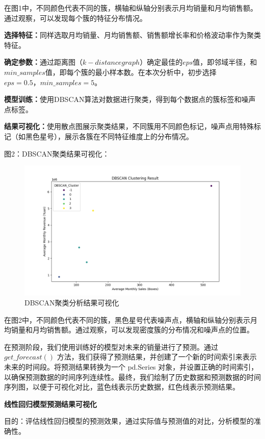 \documentclass[a4paper]{article}
\begin{document}
在图1中，不同颜色代表不同的簇，横轴和纵轴分别表示月均销量和月均销售额。通过观察，可以发现每个簇的特征分布情况。

\textbf{选择特征：}同样选取月均销量、月均销售额、销售额增长率和价格波动率作为聚类特征。

\textbf{确定参数：}通过距离图$（k-distance graph）$确定最佳的$eps$值，即邻域半径，和$min\_samples$值，即每个簇的最小样本数。在本次分析中，初步选择$eps=0.5，min\_samples=5$。

\textbf{模型训练：}使用DBSCAN算法对数据进行聚类，得到每个数据点的簇标签和噪声点标签。

\textbf{结果可视化：}使用散点图展示聚类结果，不同簇用不同颜色标记，噪声点用特殊标记（如黑色星号），展示各簇在不同特征维度上的分布情况。

图2：DBSCAN聚类结果可视化：

\begin{figure}[H]
	\centering
	\includegraphics[width=1.0\textwidth]{img/Figure_2.png}
	\caption{DBSCAN聚类分析结果可视化}
\end{figure}

在图2中，不同颜色代表不同的簇，黑色星号代表噪声点，横轴和纵轴分别表示月均销量和月均销售额。通过观察，可以发现密度簇的分布情况和噪声点的位置。



在预测阶段，我们使用训练好的模型对未来的销量进行了预测。通过 $get\_forecast()$ 方法，我们获得了预测结果，并创建了一个新的时间索引来表示未来的时间段。将预测结果转换为一个 pd.Series 对象，并设置正确的时间索引，以确保预测数据的时间序列连续性。最终，我们绘制了历史数据和预测数据的时间序列图，以便于可视化对比，蓝色线表示历史数据，红色线表示预测结果。

\textbf{线性回归模型预测结果可视化}

目的：评估线性回归模型的预测效果，通过实际值与预测值的对比，分析模型的准确性。 
\end{document}

